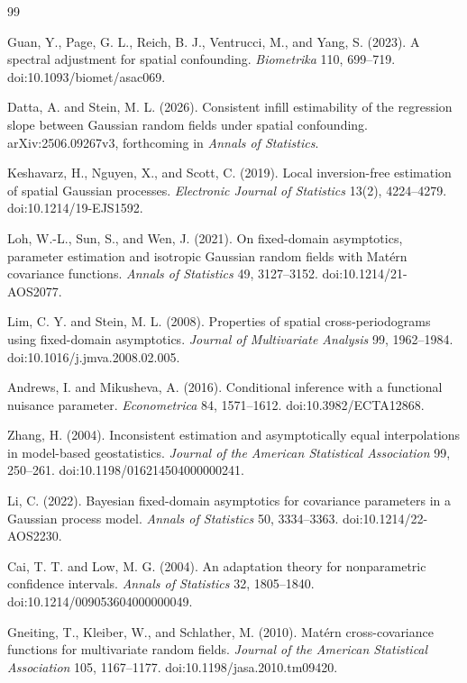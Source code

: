 \documentclass{article}
\begin{document}
\begin{thebibliography}{99}

   Guan, Y., Page, G. L., Reich, B. J., Ventrucci, M., and Yang, S. (2023). A spectral adjustment for spatial confounding. \emph{Biometrika} 110, 699--719. doi:10.1093/biomet/asac069.

   Datta, A. and Stein, M. L. (2026). Consistent infill estimability of the regression slope between Gaussian random fields under spatial confounding. arXiv:2506.09267v3, forthcoming in \emph{Annals of Statistics}.

   Keshavarz, H., Nguyen, X., and Scott, C. (2019). Local inversion-free estimation of spatial Gaussian processes. \emph{Electronic Journal of Statistics} 13(2), 4224--4279. doi:10.1214/19-EJS1592.

   Loh, W.-L., Sun, S., and Wen, J. (2021). On fixed-domain asymptotics, parameter estimation and isotropic Gaussian random fields with Mat\'ern covariance functions. \emph{Annals of Statistics} 49, 3127--3152. doi:10.1214/21-AOS2077.

   Lim, C. Y. and Stein, M. L. (2008). Properties of spatial cross-periodograms using fixed-domain asymptotics. \emph{Journal of Multivariate Analysis} 99, 1962--1984. doi:10.1016/j.jmva.2008.02.005.

   Andrews, I. and Mikusheva, A. (2016). Conditional inference with a functional nuisance parameter. \emph{Econometrica} 84, 1571--1612. doi:10.3982/ECTA12868.

   Zhang, H. (2004). Inconsistent estimation and asymptotically equal interpolations in model-based geostatistics. \emph{Journal of the American Statistical Association} 99, 250--261. doi:10.1198/016214504000000241.

   Li, C. (2022). Bayesian fixed-domain asymptotics for covariance parameters in a Gaussian process model. \emph{Annals of Statistics} 50, 3334--3363. doi:10.1214/22-AOS2230.

   Cai, T. T. and Low, M. G. (2004). An adaptation theory for nonparametric confidence intervals. \emph{Annals of Statistics} 32, 1805--1840. doi:10.1214/009053604000000049.

   Gneiting, T., Kleiber, W., and Schlather, M. (2010). Mat\'ern cross-covariance functions for multivariate random fields. \emph{Journal of the American Statistical Association} 105, 1167--1177. doi:10.1198/jasa.2010.tm09420.


\end{thebibliography}
\end{document}
